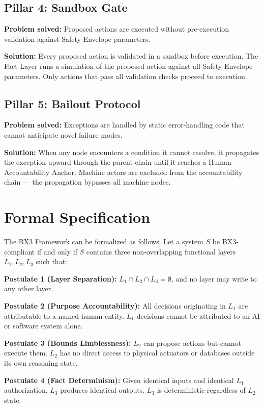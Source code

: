 \documentclass[12pt]{article}
\begin{document}
\subsection{Pillar 4: Sandbox Gate}
\textbf{Problem solved:} Proposed actions are executed without pre-execution validation against Safety Envelope parameters.

\textbf{Solution:} Every proposed action is validated in a sandbox before execution. The Fact Layer runs a simulation of the proposed action against all Safety Envelope parameters. Only actions that pass all validation checks proceed to execution.

\subsection{Pillar 5: Bailout Protocol}
\textbf{Problem solved:} Exceptions are handled by static error-handling code that cannot anticipate novel failure modes.

\textbf{Solution:} When any node encounters a condition it cannot resolve, it propagates the exception upward through the parent chain until it reaches a Human Accountability Anchor. Machine actors are excluded from the accountability chain --- the propagation bypasses all machine nodes.

\section{Formal Specification}
\label{sec:formal}

The BX3 Framework can be formalized as follows. Let a system $S$ be BX3-compliant if and only if $S$ contains three non-overlapping functional layers $L_1, L_2, L_3$ such that:

\textbf{Postulate 1 (Layer Separation):} $L_1 \cap L_2 \cap L_3 = \emptyset$, and no layer may write to any other layer.

\textbf{Postulate 2 (Purpose Accountability):} All decisions originating in $L_1$ are attributable to a named human entity. $L_1$ decisions cannot be attributed to an AI or software system alone.

\textbf{Postulate 3 (Bounds Limblessness):} $L_2$ can propose actions but cannot execute them. $L_2$ has no direct access to physical actuators or databases outside its own reasoning state.

\textbf{Postulate 4 (Fact Determinism):} Given identical inputs and identical $L_1$ authorization, $L_3$ produces identical outputs. $L_3$ is deterministic regardless of $L_2$ state.
\end{document}
